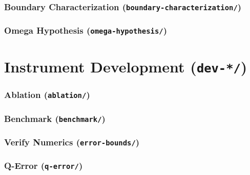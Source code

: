 \documentclass{article}
\begin{document}
\section{Boundary Characterization (\texttt{boundary-characterization/})}
\graphicspath{{crates/exp-combinatorial-cells/boundary-characterization/}}


\section{Omega Hypothesis (\texttt{omega-hypothesis/})}
\graphicspath{{crates/exp-combinatorial-cells/omega-hypothesis/}}


\part{Instrument Development (\texttt{dev-*/})}

\section{Ablation (\texttt{ablation/})}
\graphicspath{{crates/dev-algorithm-comparison/ablation/}}


\section{Benchmark (\texttt{benchmark/})}
\graphicspath{{crates/dev-algorithm-comparison/benchmark/}}


\section{Verify Numerics (\texttt{error-bounds/})}
\graphicspath{{crates/dev-numerical-analysis/error-bounds/}}


\section{Q-Error (\texttt{q-error/})}
\graphicspath{{crates/dev-numerical-analysis/q-error/}}

\end{document}
